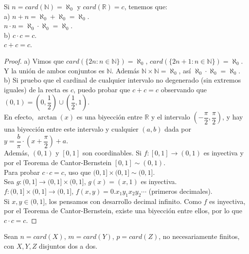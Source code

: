 \begin{eg}
    Si $n = card(\mathbb{N}) = \aleph_0$ y $card(\mathbb{R}) = c$, tenemos que: \\
    a) $n+n = \aleph_0 + \aleph_0 = \aleph_0$. \\
    $n \cdot n = \aleph_0 \cdot \aleph_0 = \aleph_0$. \\

    b) $c \cdot c = c$. \\ $c+c = c$. \\

    \begin{proof}
        a) Vimos que $card(\{ 2n : n \in \mathbb{N} \}) = \aleph_0$, $card(\{ 2n+1 : n \in \mathbb{N} \}) = \aleph_0$.
        Y la unión de ambos conjuntos es $\mathbb{N}$. Además $\mathbb{N} \times \mathbb{N} = \aleph_0$, así $\aleph_0 \cdot \aleph_0 = \aleph_0$. \\

        b) Si pruebo que el cardinal de cualquier intervalo no degenerado (sin extremos iguales) de la recta es $c$, puedo probar que $c+c=c$ observando que $(0,1) = (0, \dfrac{1}{2}) \cup (\dfrac{1}{2}, 1)$. \\
        En efecto, $\arctan(x)$ es una biyección entre $\mathbb{R}$ y el intervalo $(-\dfrac{\pi}{2}, \dfrac{\pi}{2})$, y hay una biyección entre este intervalo y cualquier $(a, b)$ dada por $y = \dfrac{b}{\pi} \cdot (x + \dfrac{\pi}{2}) + a$. \\
        Además, $(0, 1)$ y $[0, 1]$ son coordinables. Si $f: [0, 1] \to (0, 1)$ es inyectiva y por el Teorema de Cantor-Bernstein $[0, 1] \sim (0, 1)$. \\
        Para probar $c \cdot c = c$, uso que $(0, 1] \times (0, 1] \sim (0, 1]$. \\
        Sea $g: (0, 1] \to (0, 1] \times (0, 1]$, $g(x) = (x, 1)$ es inyectiva. \\
        $f: (0, 1] \times (0, 1] \to (0, 1]$, $f(x, y) = 0.x_1y_1x_2y_2\cdots$ (primeros decimales). \\
        Si $x, y \in (0, 1]$, los pensamos con desarrollo decimal infinito. Como $f$ es inyectiva, por el Teorema de Cantor-Bernstein, existe una biyección entre ellos, por lo que $c \cdot c = c$.
    \end{proof}
\end{eg}

Sean $n = card(X)$, $m = card(Y)$, $p = card(Z)$, no necesariamente finitos, con $X, Y, Z$ disjuntos dos a dos.

